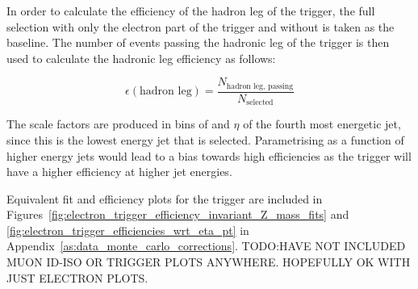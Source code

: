 In order to calculate the efficiency of the hadron leg of the trigger, the full selection with only the
electron part of the trigger and without \btagging is taken as the baseline. The number of events passing the
hadronic leg of the trigger is then used to calculate the hadronic leg efficiency as follows:

\begin{equation}
\epsilon(\text{hadron leg}) = \frac{N_{\text{hadron leg, passing}}}{N_{\text{selected}}}
\end{equation}

The scale factors are produced in bins of \pt and $\eta$ of the fourth most energetic jet, since this is the
lowest energy jet that is selected. Parametrising as a function of higher energy jets would lead to a bias
towards high efficiencies as the trigger will have a higher efficiency at higher jet energies.

Equivalent fit and efficiency plots for the trigger are included in
Figures~\ref{fig:electron_trigger_efficiency_invariant_Z_mass_fits} and
\ref{fig:electron_trigger_efficiencies_wrt_eta_pt} in Appendix~\ref{as:data_monte_carlo_corrections}.
TODO:HAVE NOT INCLUDED MUON ID-ISO OR TRIGGER PLOTS ANYWHERE. HOPEFULLY OK WITH JUST ELECTRON PLOTS.
